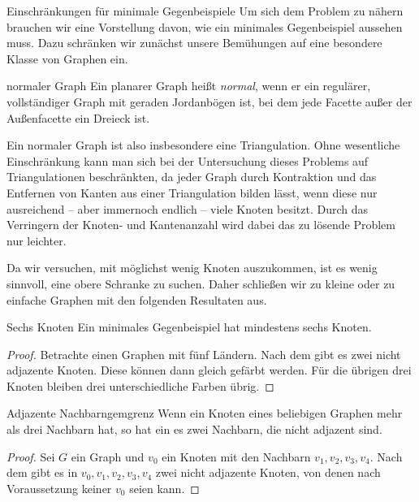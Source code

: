 \begin{section}{Einschränkungen für minimale Gegenbeispiele}
 Um sich dem Problem zu nähern brauchen wir eine Vorstellung davon, wie ein minimales Gegenbeispiel aussehen muss. Dazu schränken wir zunächst unsere Bemühungen auf eine  besondere Klasse von Graphen ein.
 
 \begin{definition}{normaler Graph}
  Ein planarer Graph heißt \textit{normal}, wenn er ein regulärer, vollständiger Graph mit geraden Jordanbögen ist, bei dem jede Facette außer der Außenfacette ein Dreieck ist.
 \end{definition}
 
 Ein normaler Graph ist also insbesondere eine Triangulation. Ohne wesentliche Einschränkung kann man sich bei der Untersuchung dieses Problems auf Triangulationen beschränkten, da jeder Graph durch Kontraktion und das Entfernen von Kanten aus einer Triangulation bilden lässt, wenn diese nur ausreichend -- aber immernoch endlich -- viele Knoten besitzt. Durch das Verringern der Knoten- und Kantenanzahl wird dabei das zu lösende Problem nur leichter. 
 
 Da wir versuchen, mit möglichst wenig Knoten auszukommen, ist es wenig sinnvoll, eine obere Schranke zu suchen. Daher schließen wir zu kleine oder zu einfache Graphen mit den folgenden Resultaten aus.
 
 \begin{proposition}{Sechs Knoten}
  Ein minimales Gegenbeispiel hat mindestens sechs Knoten.
 \end{proposition}
 \begin{proof}
  Betrachte einen Graphen mit fünf Ländern. Nach dem  gibt es zwei nicht adjazente Knoten. Diese können dann gleich gefärbt werden. Für die übrigen drei Knoten bleiben drei unterschiedliche Farben übrig.
 \end{proof}
 
 \begin{propositionl}{Adjazente Nachbarn}{gemgrenz}
  Wenn ein Knoten eines beliebigen Graphen mehr als drei Nachbarn hat, so hat ein es zwei Nachbarn, die nicht adjazent sind.
 \end{propositionl}
 \begin{proof}
  Sei $G$ ein Graph und $v_0$ ein Knoten mit den Nachbarn $v_1,v_2,v_3,v_4$. Nach dem  gibt es in $v_0,v_1,v_2,v_3,v_4$ zwei nicht adjazente Knoten, von denen nach Voraussetzung keiner $v_0$ seien kann.
 \end{proof}
 

\end{section}
